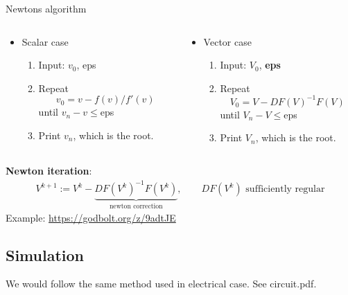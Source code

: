 \documentclass[xcolor=dvipsnames]{beamer}
\begin{document}
\begin{frame}{Newtons algorithm}

\begin{columns}
	\begin{column}{.55\textwidth}
		\begin{itemize}
		\item Scalar case
			\begin{enumerate}
				\item Input: $v_0$, eps
				\item Repeat
				\[v_0 = v - f(v)/f'(v)\]
				until $v_n-v\le$eps
				\item Print $v_n$, which is the root.
			\end{enumerate}
		\end{itemize}
	\end{column}
	\begin{column}{.75\textwidth}
 		\begin{itemize}
		\item Vector case
			\begin{enumerate}
				\item Input: $V_0$, \textbf{eps}
				\item Repeat
				\[V_0 = V - DF(V)^{-1} F(V)\]
				until $V_n-V\le$eps
				\item Print $V_n$, which is the root.
			\end{enumerate}
		\end{itemize}
    \end{column}
\end{columns}
\textbf{Newton iteration}:
\begin{align*}
 	V^{k+1}:= V^k - \underbrace{DF(V^k)^{-1}F(V^k)}_{\text{newton correction}},\qquad DF(V^k)\,\,\text{sufficiently regular}
 \end{align*} 
 Example: \url{https://godbolt.org/z/9adtJE}

\end{frame}

\subsection{Simulation}

\begin{frame}
	We would follow the same method used in electrical case. See circuit.pdf.
\end{frame}
\end{document}
